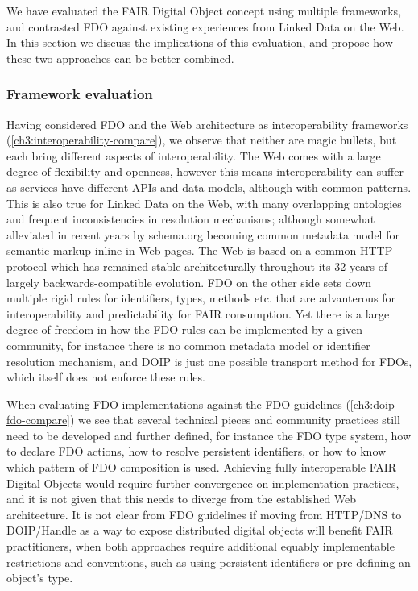 We have evaluated the FAIR Digital Object concept using multiple frameworks, and contrasted FDO against existing experiences from Linked Data on the Web. In this section we discuss the implications of this evaluation, and propose how these two approaches can be better combined.

\subsubsection{Framework evaluation}\label{ch3:frameworkevaluation}

Having considered FDO and the Web architecture as interoperability frameworks (\vref{ch3:interoperability-compare}), we observe that neither are magic bullets, but each bring different aspects of interoperability. The Web comes with a large degree of flexibility and openness, however this means interoperability can suffer as services have different APIs and data models, although with common patterns. This is also true for Linked Data on the Web, with many overlapping ontologies and frequent inconsistencies in resolution mechanisms; although somewhat alleviated in recent years by schema.org becoming common metadata model for semantic markup inline in Web pages. The Web is based on a common HTTP protocol which has remained stable architecturally throughout its 32 years of largely backwards-compatible evolution. FDO on the other side sets down multiple rigid rules for identifiers, types, methods etc. that are advanterous for interoperability and predictability for FAIR consumption. Yet there is a large degree of freedom in how the FDO rules can be implemented by a given community, for instance there is no common metadata model or identifier resolution mechanism, and DOIP is just one possible transport method for FDOs, which itself does not enforce these rules. 

When evaluating FDO implementations against the FDO guidelines (\vref{ch3:doip-fdo-compare}) we see that several technical pieces and community practices still need to be developed and further defined, for instance the FDO type system, how to declare FDO actions, how to resolve persistent identifiers, or how to know which pattern of FDO composition is used. Achieving fully interoperable FAIR Digital Objects would require further convergence on implementation practices, and it is not given that this needs to diverge from the established Web architecture.  It is not clear from FDO guidelines if moving from HTTP/DNS to DOIP/Handle as a way to expose distributed digital objects will benefit FAIR practitioners, when both approaches require additional equably implementable restrictions and conventions, such as using persistent identifiers or pre-defining an object's type. 

